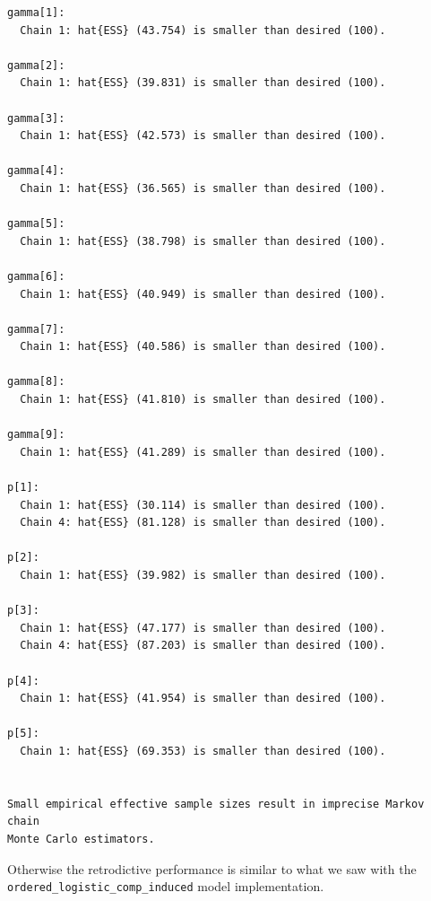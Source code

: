 \documentclass[
  letterpaper,
  DIV=11,
  numbers=noendperiod]{scrartcl}
\newenvironment{Shaded}{\begin{snugshade}}{\end{snugshade}}
\newcommand{\AttributeTok}[1]{\textcolor[rgb]{0.40,0.45,0.13}{#1}}
\newcommand{\DecValTok}[1]{\textcolor[rgb]{0.68,0.00,0.00}{#1}}
\newcommand{\FloatTok}[1]{\textcolor[rgb]{0.68,0.00,0.00}{#1}}
\newcommand{\FunctionTok}[1]{\textcolor[rgb]{0.28,0.35,0.67}{#1}}
\newcommand{\NormalTok}[1]{\textcolor[rgb]{0.00,0.23,0.31}{#1}}
\newcommand{\SpecialCharTok}[1]{\textcolor[rgb]{0.37,0.37,0.37}{#1}}
\newcommand{\StringTok}[1]{\textcolor[rgb]{0.13,0.47,0.30}{#1}}
\begin{document}
\begin{verbatim}
gamma[1]:
  Chain 1: hat{ESS} (43.754) is smaller than desired (100).

gamma[2]:
  Chain 1: hat{ESS} (39.831) is smaller than desired (100).

gamma[3]:
  Chain 1: hat{ESS} (42.573) is smaller than desired (100).

gamma[4]:
  Chain 1: hat{ESS} (36.565) is smaller than desired (100).

gamma[5]:
  Chain 1: hat{ESS} (38.798) is smaller than desired (100).

gamma[6]:
  Chain 1: hat{ESS} (40.949) is smaller than desired (100).

gamma[7]:
  Chain 1: hat{ESS} (40.586) is smaller than desired (100).

gamma[8]:
  Chain 1: hat{ESS} (41.810) is smaller than desired (100).

gamma[9]:
  Chain 1: hat{ESS} (41.289) is smaller than desired (100).

p[1]:
  Chain 1: hat{ESS} (30.114) is smaller than desired (100).
  Chain 4: hat{ESS} (81.128) is smaller than desired (100).

p[2]:
  Chain 1: hat{ESS} (39.982) is smaller than desired (100).

p[3]:
  Chain 1: hat{ESS} (47.177) is smaller than desired (100).
  Chain 4: hat{ESS} (87.203) is smaller than desired (100).

p[4]:
  Chain 1: hat{ESS} (41.954) is smaller than desired (100).

p[5]:
  Chain 1: hat{ESS} (69.353) is smaller than desired (100).


Small empirical effective sample sizes result in imprecise Markov chain
Monte Carlo estimators.
\end{verbatim}

Otherwise the retrodictive performance is similar to what we saw with
the \texttt{ordered\_logistic\_comp\_induced} model implementation.

\begin{Shaded}
\end{Shaded}
\end{document}

